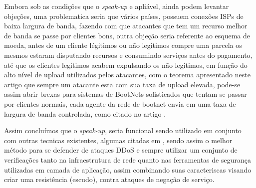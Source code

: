 \documentclass[a4paper,12pt]{article}
\begin{document}
 \vspace{0.3cm}
 
 
 Embora sob as condições que o \textit{speak-up} e apliável, ainda podem levantar objeções, uma problematica seria que vários países, possuem conexões ISPs de baixa largura de banda, fazendo com que atacantes que tem um recurso melhor de banda se passe por clientes bons, outra objeção seria referente ao esquema de moeda, antes de um cliente légitimos ou não legitimos compre uma parcela os mesmos estaram disputando recursos e consumindo serviços antes do pagamento, até que os clientes legitimos acabem expulsando os não legitimos, em função do alto nível de upload utilizados pelos atacantes, com o teorema apresentado neste artigo que sempre um atacante esta com sua taxa de upload elevada, pode-se assim abrir brexas para sistemas de BootNets sofisticados que tentam se passar por clientes normais, cada agente da rede de bootnet envia em uma taxa de largura de banda controlada, como citado no artigo \cite{7160662}.
\vspace{0.2cm}

 Assim concluímos que o \textit{speak-up}, seria funcional sendo utilizado em conjunto com outras tecnicas existentes, algumas citadas em \cite{7821722}, sendo assim  o melhor método para se defender de ataques DDoS e sempre utilizar um conjunto de verificações tanto na infraestrutura de rede quanto nas ferramentas de segurança utilizadas em camada de aplicação, assim combinando suas caracteriscas visando criar uma resistência (escudo), contra ataques de negação de serviço.  
 
 
 
\vspace{2cm}


\begin{center}
\end{center}

 
\end{document}
